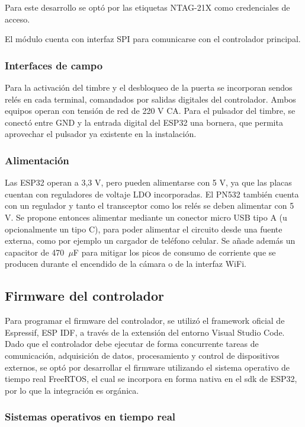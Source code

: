 Para este desarrollo se optó por las etiquetas NTAG-21X como credenciales de acceso.

El módulo cuenta con interfaz SPI para comunicarse con el controlador principal.

\subsubsection{Interfaces de campo}
Para la activación del timbre y el desbloqueo de la puerta se incorporan sendos relés en cada terminal, comandados por salidas digitales del controlador. Ambos equipos operan con tensión de red de 220 V CA.
Para el pulsador del timbre, se conectó entre GND y la entrada digital del ESP32 una bornera, que permita aprovechar el pulsador ya existente en la instalación.

\subsubsection{Alimentación}
Las ESP32 operan a 3,3 V, pero pueden alimentarse con 5 V, ya que las placas cuentan con reguladores de voltaje LDO incorporadas. El PN532 también cuenta con un regulador y tanto el transceptor como los relés se deben alimentar con 5 V. Se propone entonces alimentar mediante un conector micro USB tipo A (u opcionalmente un tipo C), para poder alimentar el circuito desde una fuente externa, como por ejemplo un cargador de teléfono celular.
Se añade además un capacitor de 470~$\mu$F para mitigar los picos de consumo de corriente que se producen durante el encendido de la cámara o de la interfaz WiFi.

\subsection{Firmware del controlador}
Para programar el firmware del controlador, se utilizó el framework oficial de Espressif, ESP IDF, a través de la extensión del entorno Visual Studio Code.
Dado que el controlador debe ejecutar de forma concurrente tareas de comunicación, adquisición de datos, procesamiento y control de dispositivos externos, se optó por desarrollar el firmware utilizando el sistema operativo de tiempo real FreeRTOS, el cual se incorpora en forma nativa en el sdk de ESP32, por lo que la integración es orgánica.

\subsubsection{Sistemas operativos en tiempo real}

